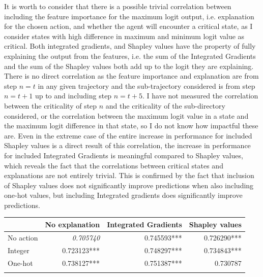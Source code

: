 \documentclass[UKenglish]{uiomasterthesis}
\begin{document}
It is worth to consider that there is a possible trivial correlation between including the feature importance for the maximum logit output, i.e. explanation for the chosen action, and whether the agent will encounter a critical state, as I consider states with high difference in maximum and minimum logit value as critical. Both integrated gradients, and Shapley values have the property of fully explaining the output from the features, i.e. the sum of the Integrated Gradients and the sum of the Shapley values both add up to the logit they are explaining. There is no direct correlation as the feature importance and explanation are from step $n = t$ in any given trajectory and the sub-trajectory considered is from step $n=t+1$ up to and including step $n=t+5$. I have not measured the correlation between the criticality of step $n$ and the criticality of the sub-directory considered, or the correlation between the maximum logit value in a state and the maximum logit difference in that state, so I do not know how impactful these are. Even in the extreme case of the entire increase in performance for included Shapley values is a direct result of this correlation, the increase in performance for included Integrated Gradients is meaningful compared to Shapley values, which reveals the fact that the correlations between critical states and explanations are not entirely trivial. This is confirmed by the fact that inclusion of Shapley values does not significantly improve predictions when also including one-hot values, but including Integrated gradients does significantly improve predictions.

\begin{center}
\label{tab:crit_simpl_log}
\begin{tabular}{lrrr}
\toprule
& No explanation & Integrated Gradients & Shapley values \\
\midrule
No action & \textit{0.705740} & 0.745593*** & 0.726290*** \\
Integer & 0.723123*** & 0.748297*** & 0.734843*** \\
One-hot & 0.738127*** & 0.751387*** & 0.730787 \\
\bottomrule
\addlinespace[2pt]
\multicolumn{3}{l}{\textsuperscript{***}$p<0.001$, 
  \textsuperscript{**}$p<0.01$, 
  \textsuperscript{*}$p<0.05$}
\end{tabular}
\end{center}
\end{document}

